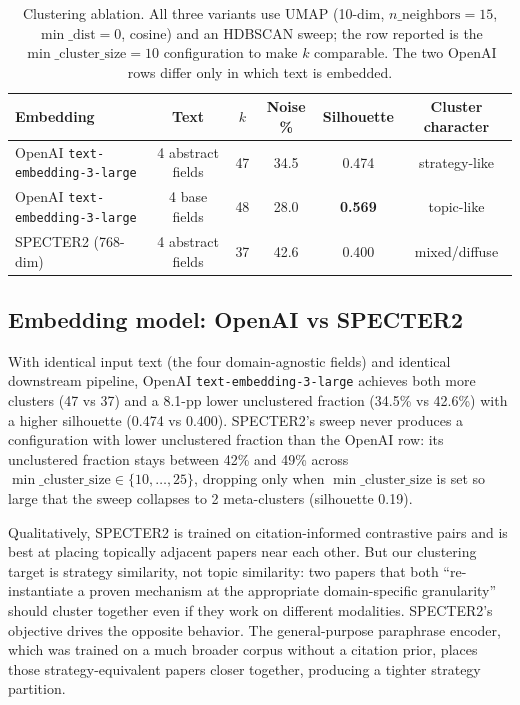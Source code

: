 \documentclass[10pt,a4paper]{article}
\begin{document}
\begin{table}[htbp]
\centering
\caption{Clustering ablation. All three variants use UMAP (10-dim, $n\_\text{neighbors}{=}15$, $\min\_\text{dist}{=}0$, cosine) and an HDBSCAN sweep; the row reported is the $\min\_\text{cluster\_size}{=}10$ configuration to make $k$ comparable. The two OpenAI rows differ only in which text is embedded.}
\label{tab:ablation}
\small
\begin{tabular}{l c c c c c}
\toprule
\textbf{Embedding} & \textbf{Text} & $k$ & \textbf{Noise \%} & \textbf{Silhouette} & \textbf{Cluster character} \\
\midrule
OpenAI \texttt{text-embedding-3-large} & 4 abstract fields & 47 & 34.5 & 0.474 & strategy-like \\
OpenAI \texttt{text-embedding-3-large} & 4 base fields     & 48 & 28.0 & \textbf{0.569} & topic-like \\
SPECTER2 (768-dim)                     & 4 abstract fields & 37 & 42.6 & 0.400 & mixed/diffuse \\
\bottomrule
\end{tabular}
\end{table}

\subsection{Embedding model: OpenAI vs SPECTER2}

With identical input text (the four domain-agnostic fields) and identical downstream pipeline, OpenAI \texttt{text-embedding-3-large} achieves both more clusters (47 vs 37) and a 8.1-pp lower unclustered fraction (34.5\% vs 42.6\%) with a higher silhouette (0.474 vs 0.400). SPECTER2's sweep never produces a configuration with lower unclustered fraction than the OpenAI row: its unclustered fraction stays between 42\% and 49\% across $\min\_\text{cluster\_size}\in\{10,\ldots,25\}$, dropping only when $\min\_\text{cluster\_size}$ is set so large that the sweep collapses to 2 meta-clusters (silhouette 0.19).

Qualitatively, SPECTER2 is trained on citation-informed contrastive pairs and is best at placing topically adjacent papers near each other. But our clustering target is strategy similarity, not topic similarity: two papers that both ``re-instantiate a proven mechanism at the appropriate domain-specific granularity'' should cluster together even if they work on different modalities. SPECTER2's objective drives the opposite behavior. The general-purpose paraphrase encoder, which was trained on a much broader corpus without a citation prior, places those strategy-equivalent papers closer together, producing a tighter strategy partition.
\end{document}
